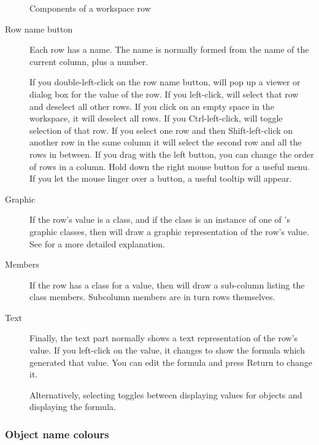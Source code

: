 \begin{figure}
\caption{Components of a workspace row}
\end{figure}

\begin{description}

\item[Row name button]
Each row has a name. The name is normally formed from the name of the current
column, plus a number.

If you double-left-click on the row name button, \nip{} will pop up a viewer
or dialog box for the value of the row. If you left-click, \nip{} will select
that row and deselect all other rows. If you click on an empty space
in the workspace, it will deselect all rows. If you
Ctrl-left-click, \nip{} will toggle selection of that row.  
If you select one row and then Shift-left-click on
another row in the same column it will select the second row and
all the rows in between. If you drag with the left button, you can change
the order of rows in a column.  Hold down the right mouse button for a useful
menu. If you let the mouse linger over a button, a useful tooltip will appear.

\item[Graphic]
If the row's value is a class, and if the class is an instance of one of
\nip{}'s graphic classes, then \nip{} will draw a graphic representation of
the row's value. See  for a more detailed explanation.

\item[Members]
If the row has a class for a value, then \nip{} will draw a sub-column listing
the class members. Subcolumn members are in turn rows themselves.

\item[Text]
Finally, the text part normally shows a text representation of the row's
value. If you left-click on the value, it changes to show the formula which
generated that value. You can edit the formula and press Return to change it.

Alternatively, selecting  toggles 
between displaying values for objects and displaying the formula.

\end{description}

\subsubsection{Object name colours}

